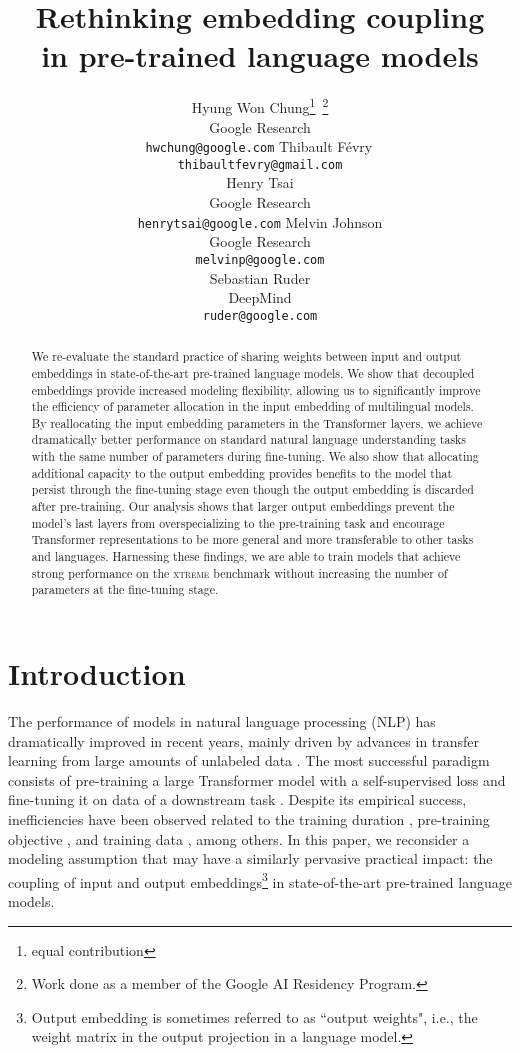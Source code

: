 \documentclass{article} \usepackage{iclr2021_conference,times}
\title{Rethinking embedding coupling\\in pre-trained language models}
\author{Hyung Won Chung\thanks{equal contribution}\, \thanks{ Work done as a member of the Google AI Residency Program.} \\ Google Research \\ \texttt{hwchung@google.com} \And  Thibault F\'evry\footnotemark[1]\, \footnotemark[2] \\ \texttt{thibaultfevry@gmail.com} \hspace{101pt} \\
\And Henry Tsai \\ Google Research \\ \texttt{henrytsai@google.com} \And Melvin Johnson \\
Google Research \\
\texttt{melvinp@google.com} \\
\And
Sebastian Ruder \\
DeepMind \\
\texttt{ruder@google.com} \\
}
\newcommand{\xtreme}{\textsc{xtreme}\xspace}
\begin{document}
\maketitle

\begin{abstract}
We re-evaluate the standard practice of sharing weights between input and output embeddings in state-of-the-art pre-trained language models. We show that decoupled embeddings provide increased modeling flexibility, allowing us to significantly improve the efficiency of parameter allocation in the input embedding of multilingual models. By reallocating the input embedding parameters in the Transformer layers, we achieve dramatically better performance on standard natural language understanding tasks with the same number of parameters during fine-tuning.
We also show that allocating additional capacity to the output embedding provides benefits to the model that persist through the fine-tuning stage even though the output embedding is discarded after pre-training. 
Our analysis shows that larger output embeddings prevent the model's last layers from overspecializing to the pre-training task and encourage Transformer representations to be more general and more transferable to other tasks and languages.
Harnessing these findings, we are able to train models that achieve strong performance on the \xtreme benchmark without increasing the number of parameters at the fine-tuning stage. 


\end{abstract}

\section{Introduction}

The performance of models in natural language processing (NLP) has dramatically improved in recent years, mainly driven by advances in transfer learning from large amounts of unlabeled data \citep{Howard2018,Devlin2019}. The most successful paradigm consists of pre-training a large Transformer \citep{Vaswani2017} model with a self-supervised loss and fine-tuning it on data of a downstream task \citep{ruder2019transfer}. Despite its empirical success, inefficiencies have been observed related to the training duration \citep{Liu2019roberta}, pre-training objective \citep{Clark2020electra}, and training data \citep{Conneau2020}, among others. In this paper, we reconsider a modeling assumption that may have a similarly pervasive practical impact: the coupling of input and output embeddings\footnote{Output embedding is sometimes referred to as ``output weights", i.e., the weight matrix in the output projection in a language model.} in state-of-the-art pre-trained language models.
\end{document}
